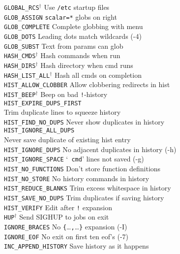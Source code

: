 \documentclass{article}
\newcommand\T[1]{\texttt{#1}}
\newcommand\D{$^\dag$}
\begin{document}
\begin{multicols}{3}
\begin{tabbing}
\T{GLOBAL\_RCS}\D         \>\> Use \verb!/etc! startup files \\
\T{GLOB\_ASSIGN}         \>\> \verb!scalar=*! globs on right \\
\T{GLOB\_COMPLETE}       \>\> Complete globbing with menu \\
\T{GLOB\_DOTS}           \>\> Leading dots match wildcards (-4) \\
\T{GLOB\_SUBST}          \>\> Text from params can glob \\
\T{HASH\_CMDS}\D         \>\> Hash commands when run \\
\T{HASH\_DIRS}\D         \>\> Hash directory when cmd runs \\
\T{HASH\_LIST\_ALL}\D    \>\> Hash all cmds on completion \\
\T{HIST\_ALLOW\_CLOBBER} \>\> Allow clobbering redirects in hist \\
\T{HIST\_BEEP}\D         \>\> Beep on bad \verb.!.-history \\
\T{HIST\_EXPIRE\_DUPS\_FIRST} \\
                         \>   Trim duplicate lines to squeeze history \\
\T{HIST\_FIND\_NO\_DUPS} \>\> Never show duplicates in history \\
\T{HIST\_IGNORE\_ALL\_DUPS} \\
                         \>   Never save duplicate of existing hist entry \\
\T{HIST\_IGNORE\_DUPS}   \>\> No adjacent duplicates in history (-h) \\
\T{HIST\_IGNORE\_SPACE}  \>\> `\verb! cmd!' lines not saved (-g) \\
\T{HIST\_NO\_FUNCTIONS}  \>\> Don't store function definitions \\
\T{HIST\_NO\_STORE}      \>\> No history commands in history \\
\T{HIST\_REDUCE\_BLANKS} \>\> Trim excess whitespace in history \\
\T{HIST\_SAVE\_NO\_DUPS} \>\> Trim duplicates if saving history \\
\T{HIST\_VERIFY}         \>\> Edit after \verb.!. expansion \\
\T{HUP}\D                \>\> Send SIGHUP to jobs on exit \\
\T{IGNORE\_BRACES}       \>\> No \verb!{!\dots\verb!,!\dots\verb!}!
   expansion (-I) \\
\T{IGNORE\_EOF}          \>\> No exit on first ten eof's (-7) \\
\T{INC\_APPEND\_HISTORY} \>\> Save history as it happens \\

\end{tabbing}
\end{multicols}
\end{document}
